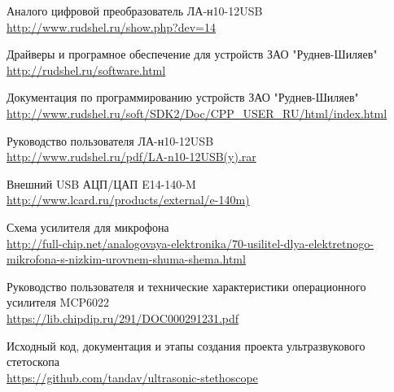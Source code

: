 \documentclass[14pt]{extarticle}
\begin{document}
\newpage
\renewcommand\refname{Ссылки на источники}
\begin{thebibliography}{}
Аналого цифровой преобразователь ЛА-н10-12USB\\
\url{http://www.rudshel.ru/show.php?dev=14}

Драйверы и програмное обеспечение для устройств ЗАО "Руднев-Шиляев"\\
\url{http://rudshel.ru/software.html}

Документация по программированию устройств ЗАО "Руднев-Шиляев"\\
\url{http://www.rudshel.ru/soft/SDK2/Doc/CPP_USER_RU/html/index.html}

Руководство пользователя ЛА-н10-12USB\\
\url{http://www.rudshel.ru/pdf/LA-n10-12USB(y).rar}

Внешний USB АЦП/ЦАП E14-140-M\\
\url{http://www.lcard.ru/products/external/e-140m)}

Схема усилителя для микрофона\\
\url{http://full-chip.net/analogovaya-elektronika/70-usilitel-dlya-elektretnogo-mikrofona-s-nizkim-urovnem-shuma-shema.html}

Руководство пользователя и технические характеристики операционного усилителя MCP6022\\
\url{https://lib.chipdip.ru/291/DOC000291231.pdf}

Исходный код, документация и этапы создания проекта ультразвукового стетоскопа\\
\url{https://github.com/tandav/ultrasonic-stethoscope}

\end{thebibliography}
\end{document}
